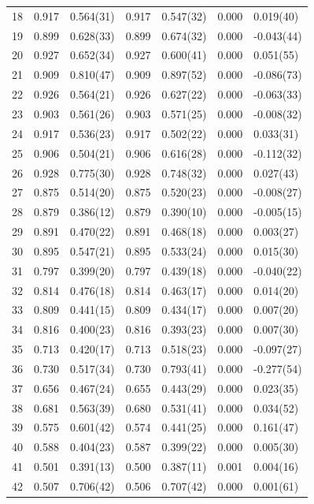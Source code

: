 \documentclass[aps, prc, tightenlines,superscriptaddress, letterpaper, amsmath, amssymb, preprintnumbers, floatfix, longbibliography, nofootinbib]{revtex4-2}
\begin{document}
\begin{table}[!htb]
{\begin{tabularx}{\textwidth}{| c || Y | Y | Y | Y | Y | Y |}
18	&	0.917	&	0.564(31)	&	0.917	&	0.547(32)	&	0.000	&	0.019(40)	\\
19	&	0.899	&	0.628(33)	&	0.899	&	0.674(32)	&	0.000	&	-0.043(44)	\\
20	&	0.927	&	0.652(34)	&	0.927	&	0.600(41)	&	0.000	&	0.051(55)	\\
21	&	0.909	&	0.810(47)	&	0.909	&	0.897(52)	&	0.000	&	-0.086(73)	\\
22	&	0.926	&	0.564(21)	&	0.926	&	0.627(22)	&	0.000	&	-0.063(33)	\\
23	&	0.903	&	0.561(26)	&	0.903	&	0.571(25)	&	0.000	&	-0.008(32)	\\
24	&	0.917	&	0.536(23)	&	0.917	&	0.502(22)	&	0.000	&	0.033(31)	\\
25	&	0.906	&	0.504(21)	&	0.906	&	0.616(28)	&	0.000	&	-0.112(32)	\\
26	&	0.928	&	0.775(30)	&	0.928	&	0.748(32)	&	0.000	&	0.027(43)	\\
27	&	0.875	&	0.514(20)	&	0.875	&	0.520(23)	&	0.000	&	-0.008(27)	\\
28	&	0.879	&	0.386(12)	&	0.879	&	0.390(10)	&	0.000	&	-0.005(15)	\\
29	&	0.891	&	0.470(22)	&	0.891	&	0.468(18)	&	0.000	&	0.003(27)	\\
30	&	0.895	&	0.547(21)	&	0.895	&	0.533(24)	&	0.000	&	0.015(30)	\\
31	&	0.797	&	0.399(20)	&	0.797	&	0.439(18)	&	0.000	&	-0.040(22)	\\
32	&	0.814	&	0.476(18)	&	0.814	&	0.463(17)	&	0.000	&	0.014(20)	\\
33	&	0.809	&	0.441(15)	&	0.809	&	0.434(17)	&	0.000	&	0.007(20)	\\
34	&	0.816	&	0.400(23)	&	0.816	&	0.393(23)	&	0.000	&	0.007(30)	\\
35	&	0.713	&	0.420(17)	&	0.713	&	0.518(23)	&	0.000	&	-0.097(27)	\\
36	&	0.730	&	0.517(34)	&	0.730	&	0.793(41)	&	0.000	&	-0.277(54)	\\
37	&	0.656	&	0.467(24)	&	0.655	&	0.443(29)	&	0.000	&	0.023(35)	\\
38	&	0.681	&	0.563(39)	&	0.680	&	0.531(41)	&	0.000	&	0.034(52)	\\
39	&	0.575	&	0.601(42)	&	0.574	&	0.441(25)	&	0.000	&	0.161(47)	\\
40	&	0.588	&	0.404(23)	&	0.587	&	0.399(22)	&	0.000	&	0.005(30)	\\
41	&	0.501	&	0.391(13)	&	0.500	&	0.387(11)	&	0.001	&	0.004(16)	\\
42	&	0.507	&	0.706(42)	&	0.506	&	0.707(42)	&	0.000	&	0.001(61)	\\

\end{tabularx}}
\end{table}
\end{document}
